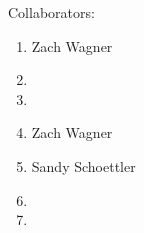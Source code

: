 \documentclass[12pt,letterpaper]{article}
\begin{document}
Collaborators:
\begin{enumerate}
\item Zach Wagner

\item 

\item 

\setcounter{enumi}{4}
\item Zach Wagner

\item Sandy Schoettler

\setcounter{enumi}{10}
\item 

\setcounter{enumi}{12}
\item
\end{enumerate}
\end{document}
